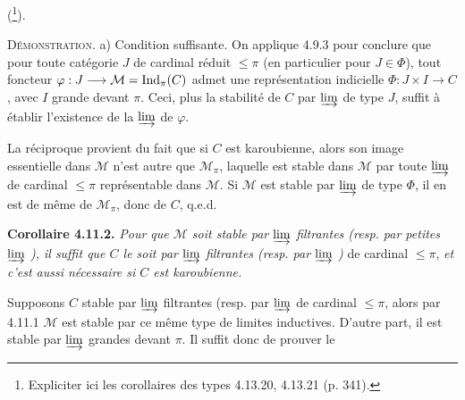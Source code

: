 (\footnote{Expliciter ici les corollaires des types 4.13.20, 4.13.21 (p. 341).}).

\textsc{Démonstration}. a) Condition suffisante. On applique 4.9.3 pour conclure que
pour toute catégorie $J$ de cardinal réduit $\leqslant \pi$ (en particulier pour $J \in \Phi$), tout foncteur $\varphi : J \longrightarrow \mathcal{M} = \mathrm{Ind}_\pi(C)$ admet une représentation indicielle $\Phi : J \times I \longrightarrow C$, avec $I$ grande devant $\pi$. Ceci, plus la stabilité de $C$ par $\varinjlim$ de type $J$, suffit à établir l'existence de la $\varinjlim$ de $\varphi$.

La réciproque provient du fait que si $C$ est karoubienne, alors son image essentielle dans $\mathcal{M}$ n'est autre que $\mathcal{M}_\pi$, laquelle est stable dans $\mathcal{M}$ par toute $\varinjlim$ de cardinal $\leqslant \pi$ représentable dans $\mathcal{M}$. Si $\mathcal{M}$ est stable par $\varinjlim$ de type $\Phi$, il en est de même de $\mathcal{M}_\pi$, donc de $C$, q.e.d.

\textbf{Corollaire 4.11.2.} \textit{Pour que $\mathcal{M}$ soit stable par $\varinjlim$ filtrantes (resp. par petites $\varinjlim$ ), il suffit que $C$ le soit par $\varinjlim$ filtrantes (resp. par $\varinjlim$ )} de cardinal $\leqslant \pi$, \textit{et c'est aussi nécessaire si $C$ est karoubienne.}

Supposons $C$ stable par $\varinjlim$ filtrantes  (resp. par $\varinjlim$ de cardinal $\leqslant \pi$, alors par 4.11.1 $\mathcal{M}$ est stable par ce même type de limites inductives. D'autre part, il est stable par $\varinjlim$ grandes devant $\pi$. Il suffit donc de prouver le


